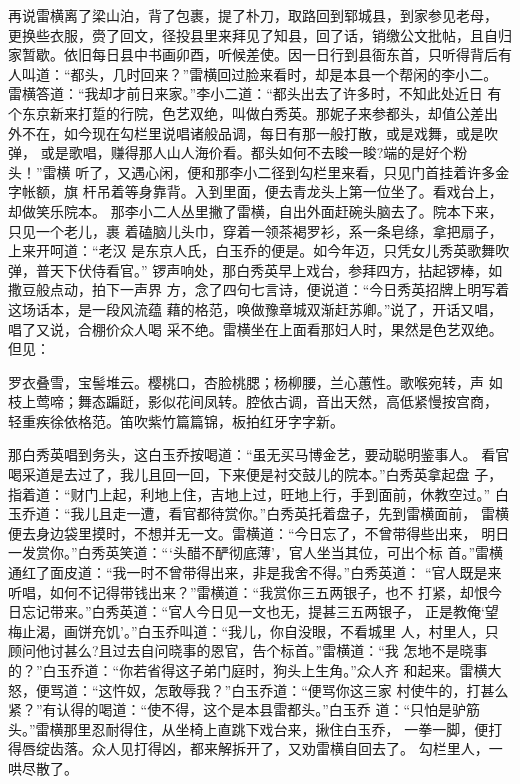 再说雷横离了梁山泊，背了包裹，提了朴刀，取路回到郓城县，到家参见老母，
更换些衣服，赍了回文，径投县里来拜见了知县，回了话，销缴公文批帖，且自归
家暂歇。依旧每日县中书画卯酉，听候差使。因一日行到县衙东首，只听得背后有
人叫道：“都头，几时回来？”雷横回过脸来看时，却是本县一个帮闲的李小二。
雷横答道：“我却才前日来家。”李小二道：“都头出去了许多时，不知此处近日
有个东京新来打踅的行院，色艺双绝，叫做白秀英。那妮子来参都头，却值公差出
外不在，如今现在勾栏里说唱诸般品调，每日有那一般打散，或是戏舞，或是吹弹，
或是歌唱，赚得那人山人海价看。都头如何不去睃一睃?端的是好个粉头！”雷横
听了，又遇心闲，便和那李小二径到勾栏里来看，只见门首挂着许多金字帐额，旗
杆吊着等身靠背。入到里面，便去青龙头上第一位坐了。看戏台上，却做笑乐院本。
那李小二人丛里撇了雷横，自出外面赶碗头脑去了。院本下来，只见一个老儿，裹
着磕脑儿头巾，穿着一领茶褐罗衫，系一条皂绦，拿把扇子，上来开呵道：“老汉
是东京人氏，白玉乔的便是。如今年迈，只凭女儿秀英歌舞吹弹，普天下伏侍看官。”
锣声响处，那白秀英早上戏台，参拜四方，拈起锣棒，如撒豆般点动，拍下一声界
方，念了四句七言诗，便说道：“今日秀英招牌上明写着这场话本，是一段风流蕴
藉的格范，唤做豫章城双渐赶苏卿。”说了，开话又唱，唱了又说，合棚价众人喝
采不绝。雷横坐在上面看那妇人时，果然是色艺双绝。但见：

罗衣叠雪，宝髻堆云。樱桃口，杏脸桃腮；杨柳腰，兰心蕙性。歌喉宛转，声
如枝上莺啼；舞态蹁跹，影似花间凤转。腔依古调，音出天然，高低紧慢按宫商，
轻重疾徐依格范。笛吹紫竹篇篇锦，板拍红牙字字新。

那白秀英唱到务头，这白玉乔按喝道：“虽无买马博金艺，要动聪明鉴事人。
看官喝采道是去过了，我儿且回一回，下来便是衬交鼓儿的院本。”白秀英拿起盘
子，指着道：“财门上起，利地上住，吉地上过，旺地上行，手到面前，休教空过。”
白玉乔道：“我儿且走一遭，看官都待赏你。”白秀英托着盘子，先到雷横面前，
雷横便去身边袋里摸时，不想并无一文。雷横道：“今日忘了，不曾带得些出来，
明日一发赏你。”白秀英笑道：“‘头醋不酽彻底薄’，官人坐当其位，可出个标
首。”雷横通红了面皮道：“我一时不曾带得出来，非是我舍不得。”白秀英道：
“官人既是来听唱，如何不记得带钱出来？”雷横道：“我赏你三五两银子，也不
打紧，却恨今日忘记带来。”白秀英道：“官人今日见一文也无，提甚三五两银子，
正是教俺‘望梅止渴，画饼充饥’。”白玉乔叫道：“我儿，你自没眼，不看城里
人，村里人，只顾问他讨甚么?且过去自问晓事的恩官，告个标首。”雷横道：“我
怎地不是晓事的？”白玉乔道：“你若省得这子弟门庭时，狗头上生角。”众人齐
和起来。雷横大怒，便骂道：“这忤奴，怎敢辱我？”白玉乔道：“便骂你这三家
村使牛的，打甚么紧？”有认得的喝道：“使不得，这个是本县雷都头。”白玉乔
道：“只怕是驴筋头。”雷横那里忍耐得住，从坐椅上直跳下戏台来，揪住白玉乔，
一拳一脚，便打得唇绽齿落。众人见打得凶，都来解拆开了，又劝雷横自回去了。
勾栏里人，一哄尽散了。


